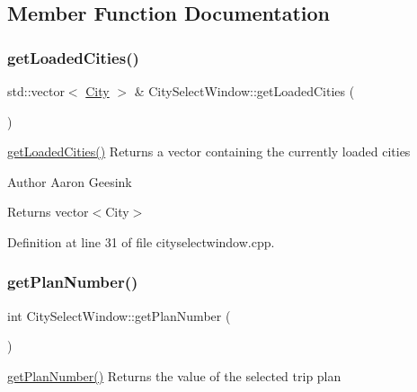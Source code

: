 \subsection{Member Function Documentation}
\mbox{\label{class_city_select_window_a7a0aacdfc7b496f7b21cba7ab6311468}} 
\subsubsection{\texorpdfstring{getLoadedCities()}{getLoadedCities()}}
{\footnotesize\ttfamily std\+::vector$<$ \mbox{\hyperlink{class_city}{City}} $>$ \& City\+Select\+Window\+::get\+Loaded\+Cities (\begin{DoxyParamCaption}{ }\end{DoxyParamCaption})}



\mbox{\hyperlink{class_city_select_window_a7a0aacdfc7b496f7b21cba7ab6311468}{get\+Loaded\+Cities()}} Returns a vector containing the currently loaded cities 

\begin{DoxyAuthor}{Author}
Aaron Geesink 
\end{DoxyAuthor}
\begin{DoxyReturn}{Returns}
vector$<$\+City$>$ 
\end{DoxyReturn}


Definition at line 31 of file cityselectwindow.\+cpp.

\mbox{\label{class_city_select_window_a63048482e621b1653250c7acbd28c3aa}} 
\subsubsection{\texorpdfstring{getPlanNumber()}{getPlanNumber()}}
{\footnotesize\ttfamily int City\+Select\+Window\+::get\+Plan\+Number (\begin{DoxyParamCaption}{ }\end{DoxyParamCaption})}



\mbox{\hyperlink{class_city_select_window_a63048482e621b1653250c7acbd28c3aa}{get\+Plan\+Number()}} Returns the value of the selected trip plan 

